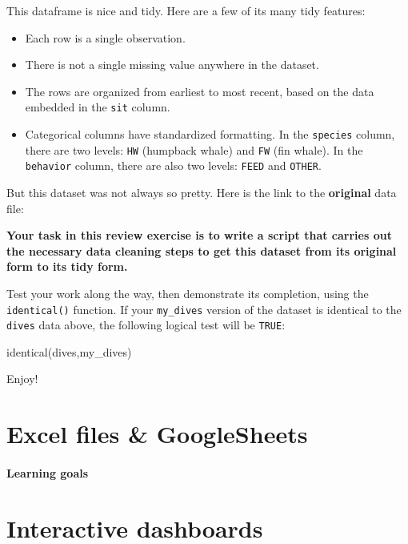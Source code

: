 \documentclass[
]{book}
\newenvironment{Shaded}{\begin{snugshade}}{\end{snugshade}}
\newcommand{\FunctionTok}[1]{\textcolor[rgb]{0.00,0.00,0.00}{#1}}
\newcommand{\NormalTok}[1]{#1}
\begin{document}
This dataframe is nice and tidy. Here are a few of its many tidy features:

\begin{itemize}
\item
  Each row is a single observation.
\item
  There is not a single missing value anywhere in the dataset.
\item
  The rows are organized from earliest to most recent, based on the data embedded in the \texttt{sit} column.
\item
  Categorical columns have standardized formatting. In the \texttt{species} column, there are two levels: \texttt{HW} (humpback whale) and \texttt{FW} (fin whale). In the \texttt{behavior} column, there are also two levels: \texttt{FEED} and \texttt{OTHER}.
\end{itemize}

But this dataset was not always so pretty. Here is the link to the \textbf{original} data file:

\textbf{Your task in this review exercise is to write a script that carries out the necessary data cleaning steps to get this dataset from its original form to its tidy form.}

Test your work along the way, then demonstrate its completion, using the \texttt{identical()} function. If your \texttt{my\_dives} version of the dataset is identical to the \texttt{dives} data above, the following logical test will be \texttt{TRUE}:

\begin{Shaded}
\begin{Highlighting}[]
\FunctionTok{identical}\NormalTok{(dives,my\_dives)}
\end{Highlighting}
\end{Shaded}

Enjoy!

\hypertarget{excel-files-googlesheets}{%
\chapter{Excel files \& GoogleSheets}\label{excel-files-googlesheets}}

\hypertarget{learning-goals-22}{%
\subsubsection*{Learning goals}\label{learning-goals-22}}

\hypertarget{interactive-dashboards}{%
\chapter*{Interactive dashboards}\label{interactive-dashboards}}
\end{document}
